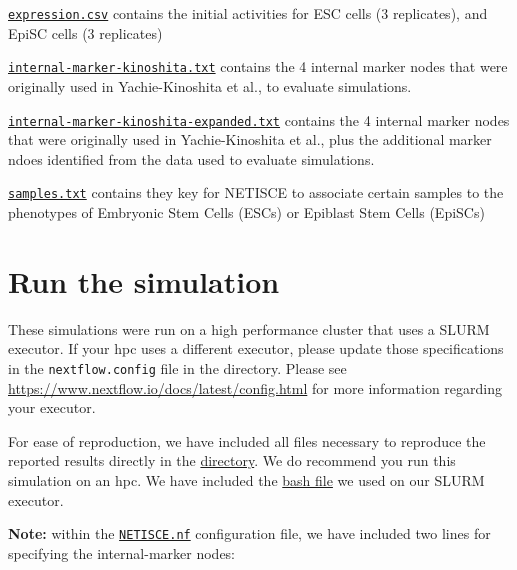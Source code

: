 \documentclass[
]{book}
\begin{document}
\href{https://github.com/VeraLiconaResearchGroup/Netisce/blob/main/ipsc_validation/input_data/expression.csv}{\texttt{expression.csv}} contains the initial activities for ESC cells (3 replicates), and EpiSC cells (3 replicates)

\href{https://github.com/VeraLiconaResearchGroup/Netisce/blob/main/ipsc_validation/input_data/internal-marker-kinoshita.txt}{\texttt{internal-marker-kinoshita.txt}} contains the 4 internal marker nodes that were originally used in Yachie-Kinoshita et al., to evaluate simulations.

\href{https://github.com/VeraLiconaResearchGroup/Netisce/blob/main/ipsc_validation/input_data/internal-marker-kinoshita-expanded.txt}{\texttt{internal-marker-kinoshita-expanded.txt}} contains the 4 internal marker nodes that were originally used in Yachie-Kinoshita et al., plus the additional marker ndoes identified from the data used to evaluate simulations.

\href{https://github.com/VeraLiconaResearchGroup/Netisce/blob/main/ipsc_validation/input_data/samples.txt}{\texttt{samples.txt}} contains they key for NETISCE to associate certain samples to the phenotypes of Embryonic Stem Cells (ESCs) or Epiblast Stem Cells (EpiSCs)

\hypertarget{run-the-simulation-1}{%
\section{Run the simulation}\label{run-the-simulation-1}}

These simulations were run on a high performance cluster that uses a SLURM executor. If your hpc uses a different executor, please update those specifications in the \texttt{nextflow.config} file in the directory. Please see \url{https://www.nextflow.io/docs/latest/config.html} for more information regarding your executor.

For ease of reproduction, we have included all files necessary to reproduce the reported results directly in the \href{https://github.com/VeraLiconaResearchGroup/Netisce/tree/main/ipsc_validation}{directory}. We do recommend you run this simulation on an hpc. We have included the \href{https://github.com/VeraLiconaResearchGroup/Netisce/blob/main/ipsc_validation/run.sh}{bash file} we used on our SLURM executor.

\textbf{Note: } within the \href{https://github.com/VeraLiconaResearchGroup/Netisce/blob/main/ipsc_validation/NETISCE.nf}{\texttt{NETISCE.nf}} configuration file, we have included two lines for specifying the internal-marker nodes:
\end{document}
